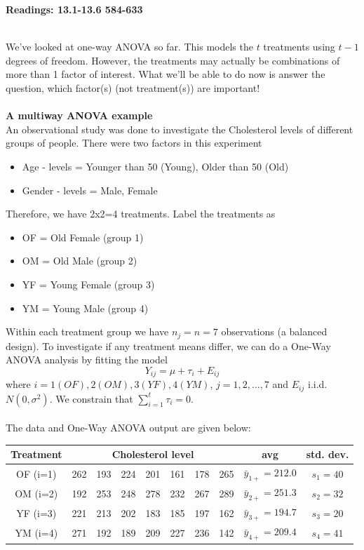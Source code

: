 \begin{center}\large\textbf{Readings: 13.1-13.6 584-633}\\
\normalsize \end{center}
\large \hlinewd{2pt}
~\\
We've looked at one-way ANOVA so far.  This models the $t$ treatments using $t-1$ degrees of freedom.  However, the treatments may actually be combinations of more than 1 factor of interest.  What we'll be able to do now is answer the question, which factor(s) (not treatment(s)) are important!\\~\\

\textbf{A multiway ANOVA example}\\
An observational study was done to investigate the Cholesterol levels of different groups of people.  There were two factors in this experiment
\begin{itemize}
\item Age - levels = Younger than 50 (Young), Older than 50 (Old)
\item Gender - levels = Male, Female
\end{itemize}
Therefore, we have 2x2=4 treatments.  Label the treatments as
\begin{itemize}
\item OF = Old Female (group 1)
\item OM = Old Male (group 2)
\item YF = Young Female (group 3)
\item YM = Young Male (group 4)
\end{itemize}
Within each treatment group we have $n_j=n=7$ observations (a balanced design).  To investigate if any treatment means differ, we can do a One-Way ANOVA analysis by fitting the model
$$Y_{ij} = \mu + \tau_i + E_{ij}$$
where $i=1 (OF),2 (OM),3 (YF),4 (YM)$, $j=1,2,\ldots,7$ and $E_{ij}$ i.i.d. $N(0,\sigma^2)$.  We constrain that $\sum_{i=1}^{t}\tau_i=0$. \\~\\
The data and One-Way ANOVA output are given below:
\begin{center}
\begin{tabular}{c|ccccccc|cc} \hline
Treatment & \multicolumn{7}{c}{Cholesterol level}& avg & std. dev. \\ \hline
OF (i=1) & 262 & 193 & 224 & 201 & 161 & 178 & 265 & $\bar{y}_{1+}=212.0$& $s_{1}=40$\\ 
OM (i=2) & 192 & 253 & 248 & 278 & 232 & 267 & 289 & $\bar{y}_{2+}=251.3$& $s_{2}=32$\\ 
YF (i=3) & 221 & 213 & 202 & 183 & 185 & 197 & 162 & $\bar{y}_{3+}=194.7$ & $s_{3}=20$\\ 
YM (i=4) & 271 & 192 & 189 & 209 & 227 & 236 & 142 & $\bar{y}_{4+}=209.4$& $s_{4}=41$\\ 
 \hline
\end{tabular}
\end{center}

